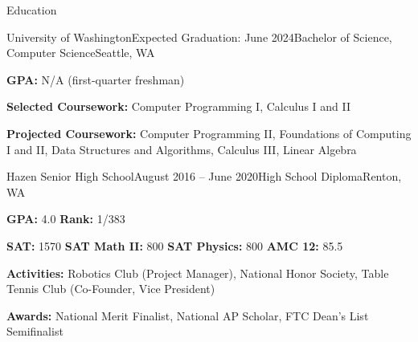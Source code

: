 \documentclass{resume} %
\begin{document}
\begin{rSection}{Education}

\begin{rSubsection}{University of Washington}{Expected Graduation: June 2024}{Bachelor of Science, Computer Science}{Seattle, WA}
\item {\bf GPA:} N/A (first-quarter freshman)
\item {\bf Selected Coursework:} Computer Programming I, Calculus I and II
\item {\bf Projected Coursework:} Computer Programming II, Foundations of Computing I and II, Data Structures and Algorithms, Calculus III, Linear Algebra
\end{rSubsection}

\begin{rSubsection}{Hazen Senior High School}{August 2016 – June 2020}{High School Diploma}{Renton, WA}
\item {\bf GPA:} 4.0 {\bf Rank:} 1/383
\item {\bf SAT:} 1570 {\bf SAT Math II:} 800 {\bf SAT Physics:} 800 {\bf AMC 12:} 85.5
\item {\bf Activities:} Robotics Club (Project Manager), National Honor Society, Table Tennis Club (Co-Founder, Vice President)
\item {\bf Awards:} National Merit Finalist, National AP Scholar, FTC Dean's List Semifinalist
\end{rSubsection}

\end{rSection}

\end{document}
